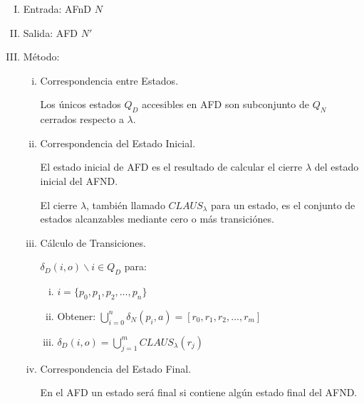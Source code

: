 \begin{enumerate}[I.]

\item Entrada: AFnD $N$

\item Salida: AFD $N\prime$

\item Método:
{
\begin{enumerate}[i.]
\item Correspondencia entre Estados.

{ Los \'unicos estados $Q_{D}$ accesibles en AFD son subconjunto de $Q_{N}$
cerrados respecto a $\lambda$.}

\item Correspondencia del Estado Inicial.

{ El estado inicial de AFD es el resultado de calcular el cierre $\lambda$
del estado inicial del AFND.}

{\cor El cierre $\lambda$, también llamado $CLAUS_\lambda$ para un estado, es el conjunto de estados alcanzables mediante cero o más transiciónes.}

\item Cálculo de Transiciones.

{

\form $\delta_{D} (i,o) \backslash i \in Q_{D}$ para:

\begin{enumerate}[i.]
\item $i = \{p_{0}, p_{1}, p_{2}, \ldots, p_{n} \}$
\item Obtener: $\bigcup\limits^{n}_{i=0} \delta_{N}(p_{i},a) = [r_{0}, r_{1},
r_{2}, \ldots, r_{m} ]$
\item $\delta_{D} (i,o) = \bigcup\limits^{m}_{j=1}   CLAUS_{\lambda}(r_{j})$
\end{enumerate}
}

\item Correspondencia del Estado Final.

{ En el AFD un estado ser\'a final si contiene alg\'un estado final del
AFND.}

\end{enumerate}

}

\end{enumerate}

